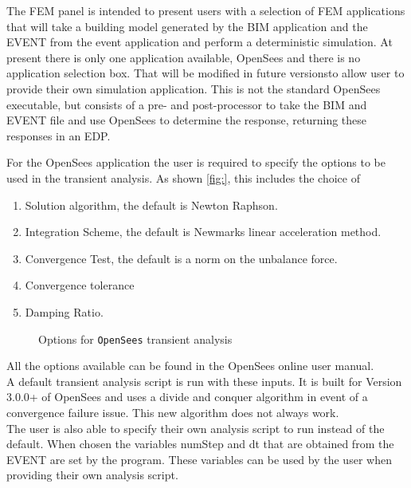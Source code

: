 The FEM panel is intended to present users with a selection of FEM
applications that will take a building model generated by the BIM
application and the EVENT from the event application and perform a
deterministic simulation.  At present there is only one application
available, OpenSees and there is no application selection box.  That
will be modified in future versionsto allow user to provide their own
simulation application.  This is not the standard OpenSees executable,
but consists of a pre- and post-processor to take the BIM and EVENT
file and use OpenSees to determine the response, returning these
responses in an EDP.

For the OpenSees application the user is required to specify the
options to be used in the transient analysis. As shown \autoref{fig:},
this includes the choice of
\begin{enumerate}
\item Solution algorithm, the default is Newton Raphson.
\item Integration Scheme, the default is Newmarks linear acceleration
  method.
\item Convergence Test, the default is a norm on the unbalance force.
\item Convergence tolerance
\item Damping Ratio.
\end{enumerate}

\begin{figure}[!htbp]
  \caption{Options for \texttt{OpenSees} transient analysis}
  \label{fig:fem}
\end{figure}

All the options available can be found in the OpenSees online user
manual.\\

A default transient analysis script is run with these inputs. It is
built for Version 3.0.0+ of OpenSees and uses a divide and conquer
algorithm in event of a convergence failure issue. This new algorithm
does not always work. \\

The user is also able to specify their own analysis script to run
instead of the default. When chosen the variables numStep and dt that
are obtained from the EVENT are set by the program. These variables
can be used by the user when providing their own analysis script.
